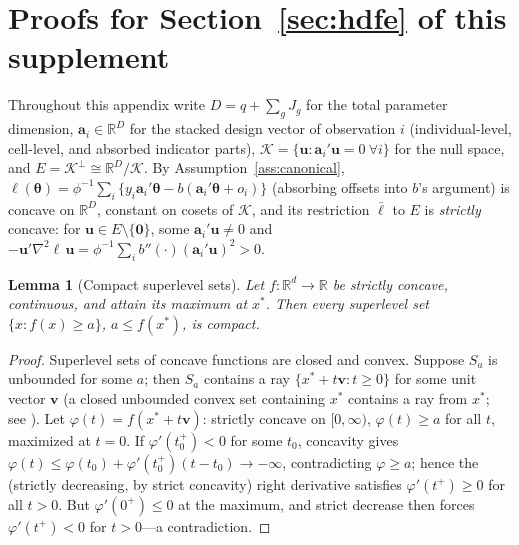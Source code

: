 \documentclass[11pt]{article}
\newtheorem{lemma}{Lemma}
\newcommand{\R}{\mathbb{R}}
\newcommand{\btheta}{\bm{\theta}}
\newcommand{\ba}{\mathbf{a}}
\newcommand{\bu}{\mathbf{u}}
\newcommand{\bv}{\mathbf{v}}
\newcommand{\bzero}{\mathbf{0}}
\renewcommand{\thesection}{S\arabic{section}}
\begin{document}
\appendix
\renewcommand{\thesection}{S-\Alph{section}}

\section{Proofs for Section~\ref{sec:hdfe} of this supplement}\label{app:global}

Throughout this appendix write $D = q + \sum_g J_g$ for the total
parameter dimension, $\ba_i \in \R^{D}$ for the stacked design vector of
observation $i$ (individual-level, cell-level, and absorbed indicator
parts), $\mathcal{K} = \{ \bu : \ba_i'\bu = 0 \ \forall i \}$ for the
null space, and $E = \mathcal{K}^{\perp} \cong \R^{D}/\mathcal{K}$.  By
Assumption~\ref{ass:canonical}, $\ell(\btheta) = \phi^{-1}\sum_i \{y_i
\ba_i'\btheta - b(\ba_i'\btheta + o_i)\}$ (absorbing offsets into $b$'s
argument) is concave on $\R^D$, constant on cosets of $\mathcal{K}$, and
its restriction $\bar\ell$ to $E$ is \emph{strictly} concave: for
$\bu \in E \setminus \{\bzero\}$, some $\ba_i'\bu \ne 0$ and
$-\bu'\nabla^2\ell\,\bu = \phi^{-1}\sum_i b''(\cdot)(\ba_i'\bu)^2 > 0$.

\begin{lemma}[Compact superlevel sets]\label{lem:levelsets}
Let $f : \R^d \to \R$ be strictly concave, continuous, and attain its
maximum at $x^\ast$.  Then every superlevel set
$\{x : f(x) \ge a\}$, $a \le f(x^\ast)$, is compact.
\end{lemma}

\begin{proof}
Superlevel sets of concave functions are closed and convex.  Suppose
$S_a$ is unbounded for some $a$; then $S_a$ contains a ray
$\{x^\ast + t\bv : t \ge 0\}$ for some unit vector $\bv$ (a closed
unbounded convex set containing $x^\ast$ contains a ray from $x^\ast$;
see \citealp[Thm.~8.4]{rockafellar1970}).  Let
$\varphi(t) = f(x^\ast + t\bv)$: strictly concave on $[0, \infty)$,
$\varphi(t) \ge a$ for all $t$, maximized at $t = 0$.  If
$\varphi'(t_0^+) < 0$ for some $t_0$, concavity gives $\varphi(t) \le
\varphi(t_0) + \varphi'(t_0^+)(t - t_0) \to -\infty$, contradicting
$\varphi \ge a$; hence the (strictly decreasing, by strict concavity)
right derivative satisfies $\varphi'(t^+) \ge 0$ for all $t > 0$.  But
$\varphi'(0^+) \le 0$ at the maximum, and strict decrease then forces
$\varphi'(t^+) < 0$ for $t > 0$---a contradiction.
\end{proof}
\end{document}
